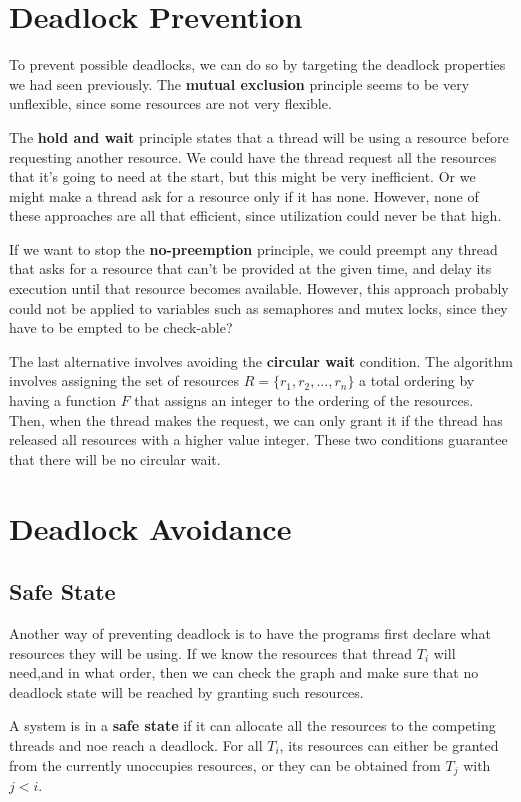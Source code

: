 \documentclass{tufte-handout}
\begin{document}
\section{Deadlock Prevention}
To prevent possible deadlocks, we can do so by targeting the deadlock properties 
we had seen previously. The \textbf{mutual exclusion} principle seems to be very 
unflexible, since some resources are not very flexible.

The \textbf{hold and wait} principle states that a thread will be using a resource
before requesting another resource. We could have the thread request all the 
resources that it's going to need at the start, but this might be very inefficient.
Or we might make a thread ask for a resource only if it has none. However, none of 
these approaches are all that efficient, since utilization could never be that high.

If we want to stop the \textbf{no-preemption} principle, we could preempt any thread
that asks for a resource that can't be provided at the given time, and delay its 
execution until that resource becomes available. However, this approach probably
could not be applied to variables such as semaphores and mutex locks, since they 
have to be empted to be check-able?

The last alternative involves avoiding the \textbf{circular wait} condition. The 
algorithm involves assigning the set of resources $R = \{r_{1}, r_{2}, ..., r_{n}\}$
a total ordering by having a function $F$ that assigns an integer to the ordering
of the resources. Then, when the thread makes the request, we can only grant it if
the thread has released all resources with a higher value integer. These two 
conditions guarantee that there will be no circular wait.

\section{Deadlock Avoidance}
\subsection{Safe State}
Another way of preventing deadlock is to have the programs first declare what 
resources they will be using. If we know the resources that thread 
$T_{i}$ will need,and in what order, then we can check the graph and make sure 
that no deadlock state will be reached by granting such resources.

A system is in a \textbf{safe state} if it can allocate all the resources
to the competing threads and noe reach a deadlock. For all $T_{i}$, its
resources can either be granted from the currently unoccupies resources, 
or they can be obtained from $T_{j}$ with $j < i$.
\end{document}
